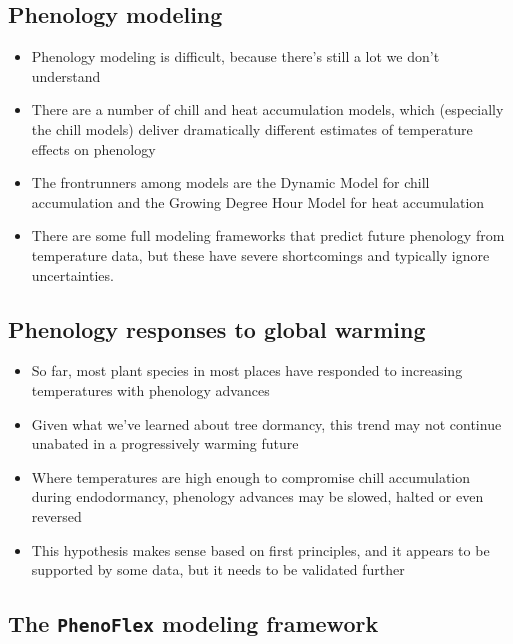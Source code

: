 \documentclass[
]{book}
\providecommand{\tightlist}{%
  \setlength{\itemsep}{0pt}\setlength{\parskip}{0pt}}
\begin{document}
\hypertarget{phenology-modeling}{%
\subsection{Phenology modeling}\label{phenology-modeling}}

\begin{itemize}
\tightlist
\item
  Phenology modeling is difficult, because there's still a lot we don't understand
\item
  There are a number of chill and heat accumulation models, which (especially the chill models) deliver dramatically different estimates of temperature effects on phenology
\item
  The frontrunners among models are the Dynamic Model for chill accumulation and the Growing Degree Hour Model for heat accumulation
\item
  There are some full modeling frameworks that predict future phenology from temperature data, but these have severe shortcomings and typically ignore uncertainties.
\end{itemize}

\hypertarget{phenology-responses-to-global-warming}{%
\subsection{Phenology responses to global warming}\label{phenology-responses-to-global-warming}}

\begin{itemize}
\tightlist
\item
  So far, most plant species in most places have responded to increasing temperatures with phenology advances
\item
  Given what we've learned about tree dormancy, this trend may not continue unabated in a progressively warming future
\item
  Where temperatures are high enough to compromise chill accumulation during endodormancy, phenology advances may be slowed, halted or even reversed
\item
  This hypothesis makes sense based on first principles, and it appears to be supported by some data, but it needs to be validated further
\end{itemize}

\hypertarget{the-phenoflex-modeling-framework}{%
\subsection{\texorpdfstring{The \texttt{PhenoFlex} modeling framework}{The PhenoFlex modeling framework}}\label{the-phenoflex-modeling-framework}}
\end{document}
